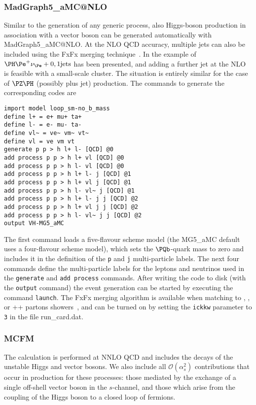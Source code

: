 \subsubsection{MadGraph5\_aMC@NLO}
\label{sec:aMCNLO-sub-sub-VH}

Similar to the generation of any generic process, also Higgs-boson production
in association with a vector boson can be generated automatically with
{\sc MadGraph5\_aMC@NLO}. At the NLO QCD accuracy, multiple jets can 
also be included using the FxFx merging technique~\cite{Frederix:2012ps}. In
 the example of $\PH \Pe^+ \nu_{\Pe} + 0,1 \textrm{jets}$ has
been presented, and adding a further jet at the NLO is feasible with
a small-scale cluster. The situation is entirely similar for the case
of $\PZ\PH$ (possibly plus jet) production. The commands to generate 
the corresponding codes are
\begin{verbatim}
import model loop_sm-no_b_mass
define l+ = e+ mu+ ta+
define l- = e- mu- ta-
define vl~ = ve~ vm~ vt~
define vl = ve vm vt
generate p p > h l+ l- [QCD] @0
add process p p > h l+ vl [QCD] @0
add process p p > h l- vl [QCD] @0
add process p p > h l+ l- j [QCD] @1
add process p p > h l+ vl j [QCD] @1
add process p p > h l- vl~ j [QCD] @1
add process p p > h l+ l- j j [QCD] @2
add process p p > h l+ vl j j [QCD] @2
add process p p > h l- vl~ j j [QCD] @2
output VH-MG5_aMC
\end{verbatim}
The first command loads a five-flavour scheme model (the {\sc MG5\_aMC} default
uses a four-flavour scheme model), which sets the $\PQb$-quark mass to zero and
includes it in the definition of the \texttt{p} and \texttt{j} multi-particle
labels. The next four commands define the multi-particle labels for the
leptons and neutrinos used in the \texttt{generate} and \texttt{add process}
commands. After writing the code to disk (with the \texttt{output} command)
the event generation can be started by executing the command
\texttt{launch}. The FxFx merging algorithm is available when matching to
, , or \HERWIG++ partons
showers~\cite{Frederix:2012ps,Frederix:2015eii}, and can be turned on by
setting the \texttt{ickkw} parameter to \texttt{3} in the file run\_card.dat.

\subsubsection{MCFM}

The calculation is performed at NNLO QCD
and includes the decays of the unstable
Higgs and vector bosons. We also include all
$\mathcal{O}(\alpha_s^2)$ contributions that occur in production for
these processes: those mediated by the exchange of a single
off-shell vector boson in the $s$-channel, and those which arise
from the coupling of the Higgs boson to a closed loop of
fermions.

